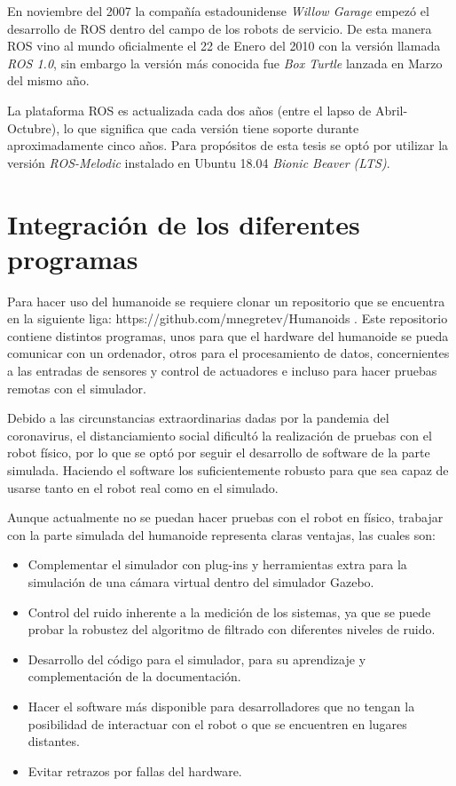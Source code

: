 En noviembre del 2007 la compañía estadounidense \textit{Willow Garage} empezó el desarrollo de ROS dentro del campo de los robots de servicio. De esta manera ROS vino al mundo oficialmente el 22 de Enero del 2010 con la versión llamada \textit{ROS 1.0}, sin embargo la versión más conocida fue \textit{Box Turtle} lanzada en Marzo del mismo año.

La plataforma ROS es actualizada cada dos años (entre el lapso de Abril-Octubre), lo que significa que cada versión tiene soporte durante aproximadamente cinco años. Para propósitos de esta tesis se optó por utilizar la versión \textit{ROS-Melodic} instalado en Ubuntu 18.04 \textit{Bionic Beaver (LTS)}.

	\section{Integración de los diferentes programas}
	Para hacer uso del humanoide se requiere clonar un repositorio que se encuentra en la siguiente liga: https://github.com/mnegretev/Humanoids . Este repositorio contiene distintos programas, unos para que el hardware del humanoide se pueda comunicar con un ordenador, otros para el procesamiento de datos, concernientes a las entradas de sensores y control de actuadores e incluso para hacer pruebas remotas con el simulador.
	
	Debido a las circunstancias extraordinarias dadas por la pandemia del coronavirus, el distanciamiento social dificultó la realización de pruebas con el robot físico, por lo que se optó por seguir el desarrollo de software de la parte simulada. Haciendo el software los suficientemente robusto para que sea capaz de usarse tanto en el robot real como en el simulado.
	
	Aunque actualmente no se puedan hacer pruebas con el robot en físico, trabajar con la parte simulada del humanoide representa claras ventajas, las cuales son: 
	 
	\begin{itemize}
	 	\item Complementar el simulador con plug-ins y herramientas extra para la simulación de una cámara virtual dentro del simulador Gazebo.
	 	\item Control del ruido inherente a la medición de los sistemas, ya que se puede probar la robustez del algoritmo de filtrado con diferentes niveles de ruido.
	 	\item Desarrollo del código para el simulador, para su aprendizaje y complementación de la documentación.
	 	\item Hacer el software más disponible para desarrolladores que no tengan la posibilidad de interactuar con el robot o que se encuentren en lugares distantes.
	 	\item Evitar retrazos por fallas del hardware.
	\end{itemize}
	
